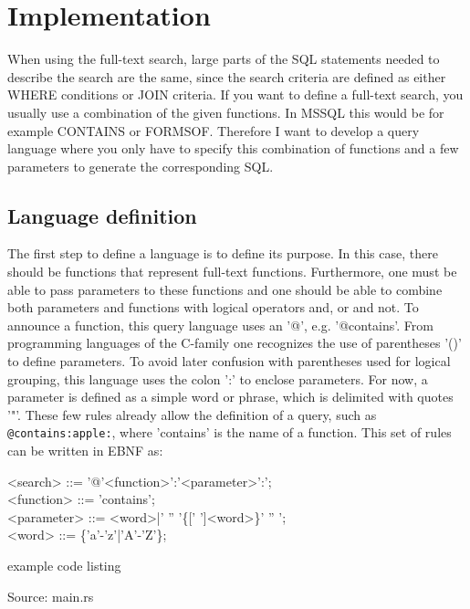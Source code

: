 \newpage
\section{Implementation}
When using the full-text search, large parts of the SQL statements needed to describe the search are the same, since the search criteria are defined as either WHERE conditions or JOIN criteria. If you want to define a full-text search, you usually use a combination of the given functions. In MSSQL this would be for example CONTAINS or FORMSOF. Therefore I want to develop a query language where you only have to specify this combination of functions and a few parameters to generate the corresponding SQL.
\subsection{Language definition}
The first step to define a language is to define its purpose. In this case, there should be functions that represent full-text functions. Furthermore, one must be able to pass parameters to these functions and one should be able to combine both parameters and functions with logical operators and, or and not.
To announce a function, this query language uses an '@', e.g. '@contains'. From programming languages of the C-family one recognizes the use of parentheses '()' to define parameters. To avoid later confusion with parentheses used for logical grouping, this language uses the colon ':' to enclose parameters. For now, a parameter is defined as a simple word or phrase, which is delimited with quotes '"'. These few rules already allow the definition of a query, such as \lstinline[language=Fulltext-Search]$@contains:apple:$, where 'contains' is the name of a function.
This set of rules can be written in \ac{EBNF} as:
\begin{grammar}
    <search> ::= '@'<function>':'<parameter>':'; \\
    <function> ::= 'contains'; \\
    <parameter> ::= <word>|' '' '\{[' ']<word>\}' '' '; \\
    <word> ::= \{'a'-'z'|'A'-'Z'\};
\end{grammar}
\begin{mycapcode}[H]
    \caption{example code listing}
    
    \centerline{Source: main.rs}
\end{mycapcode}
